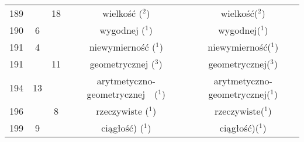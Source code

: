 \documentclass[a4paper,11pt]{article}
\begin{document}
\begin{center}
\begin{tabular}{|c|c|c|c|c|}
    189 & & 18 & wielkość ($^{ 2 }$) & wielkość($^{ 2 }$) \\
    190 &  6 & & wygodnej ($^{ 1 }$) & wygodnej($^{ 1 }$) \\
    191 &  4 & & niewymierność ($^{ 1 }$) & niewymierność($^{ 1 }$) \\
    191 & & 11 & geometrycznej ($^{ 3 }$) & geometrycznej($^{ 3 }$) \\
    194 & 13 & & arytmetyczno-geometrycznej~~($^{ 1 }$)
           & arytmetyczno-geometrycznej($^{ 1 }$) \\
    196 & &  8 & rzeczywiste ($^{ 1 }$) & rzeczywiste($^{ 1 }$) \\
    199 &  9 & & ciągłość) ($^{ 1 }$) & ciągłość)($^{ 1 }$) \\
    \hline
  \end{tabular}





  \newpage


\end{center}
\end{document}
